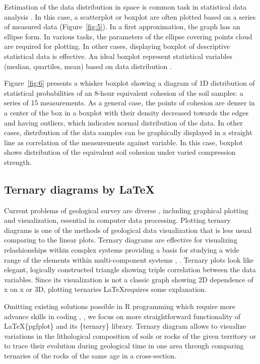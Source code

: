 \documentclass[a4paper,10pt]{article}
\begin{document}
Estimation of the data distribution in space is common task in statistical data analysis \cite{Gorokhovsky}. In this case, a scatterplot or boxplot are often plotted based on a series of measured data (Figure~\ref{fig:5}). In a first approximation, the graph has an ellipse form. In various tasks, the parameters of the ellipse covering points cloud are required for plotting. In other cases, displaying boxplot of descriptive statistical data is effective. An ideal boxplot represent statistical variables (median, quartiles, mean) based on data distribution \cite{Porotov}.

Figure~\ref{fig:6} presents a whisker boxplot showing a diagram of 1D distribution of statistical probabilities of an 8-hour equivalent cohesion of the soil samples: a series of 15 measurements. As a general case, the points of cohesion are denser in a center of the box in a boxplot with their density decreased towards the edges and having outliers, which indicates normal distribution of the data. In other cases, distribution of the data samples can be graphically displayed in a straight line as correlation of the measurements against variable. In this case, boxplot shows distribution of the equivalent soil cohesion under varied compression strength.

\subsection{Ternary diagrams by \LaTeX}

Current problems of geological survey are diverse \cite{Lemenkov2016a}, \cite{Lemenkov2016b} including graphical plotting and visualization, essential in computer data processing. Plotting ternary diagrams is one of the methods of geological data visualization that is less usual comparing to the linear plots. Ternary diagrams are effective for visualizing relashionships within complex systems providing a basis for studying a wide range of the elements within multi-component systems \cite{West1982}, \cite{West2017}.
Ternary plots look like elegant, logically constructed triangle showing triple correlation between the data variables. Since its visualization is not a classic graph showing 2D dependence of x on x or 3D, plotting ternaries \LaTeX \space requires some explanation. 

Omitting existing solutions possible in R programming which require more advance skills in coding \cite{Lemenkova201999}, \cite{Lemenkova201991}, we focus on more straightforward functionality of \LaTeX \space \{pgfplot\} and its \{ternary\} library. Ternary diagram allows to visualize variations in the lithological composition of soils or rocks of the given territory or to trace their evolution during geological time in one area through comparing ternaries of the rocks of the same age in a cross-section.
\end{document}
